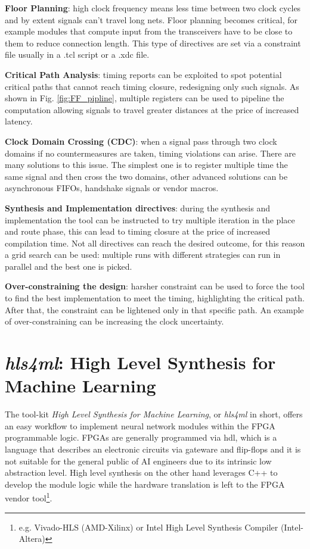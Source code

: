 \documentclass[../../main.tex]{subfiles}
\begin{document}
\textbf{Floor Planning}: high clock frequency means less time between two clock cycles and by extent signals can't travel long nets. Floor planning becomes critical, for example modules that compute input from the transceivers have to be close to them to reduce connection length. This type of directives are set via a constraint file usually in a .tcl script or a .xdc file.  

\textbf{Critical Path Analysis}: timing reports can be exploited to spot potential critical paths that cannot reach timing closure, redesigning only such signals. As shown in Fig. \ref{fig:FF_pipline}, multiple registers can be used to pipeline the computation allowing signals to travel greater distances at the price of increased latency.

\textbf{Clock Domain Crossing (CDC)}: when a signal pass through two clock domains if no countermeasures are taken, timing violations can arise. There are many solutions to this issue. The simplest one is to register multiple time the same signal and then cross the two domains, other advanced solutions can be asynchronous FIFOs, handshake signals or vendor macros.

\textbf{Synthesis and Implementation directives}: during the synthesis and implementation the tool can be instructed to try multiple iteration in the place and route phase, this can lead to timing closure at the price of increased compilation time. Not all directives can reach the desired outcome, for this reason a grid search can be used: multiple runs with different strategies can run in parallel and the best one is picked.

\textbf{Over-constraining the design}: harsher constraint can be used to force the tool to find the best implementation to meet the timing, highlighting the critical path. After that, the constraint can be lightened only in that specific path. An example of over-constraining can be increasing the clock uncertainty.
    
\section{\textit{hls4ml}: High Level Synthesis for Machine Learning}
\label{sec:FPGA_hls4ml}
The tool-kit \textit{High Level Synthesis for Machine Learning}, or \textit{hls4ml} in short, offers an easy workflow to implement neural network modules within the FPGA programmable logic. FPGAs are generally programmed via \acrfull{hdl}, which is a language that describes an electronic circuits via gateware and flip-flops and it is not suitable for the general public of AI engineers due to its intrinsic low abstraction level. High level synthesis on the other hand leverages C++ to develop the module logic while the hardware translation is left to the FPGA vendor tool\footnote{e.g. Vivado-HLS (AMD-Xilinx) or Intel High Level Synthesis Compiler (Intel-Altera)}.  
    
\end{document}
